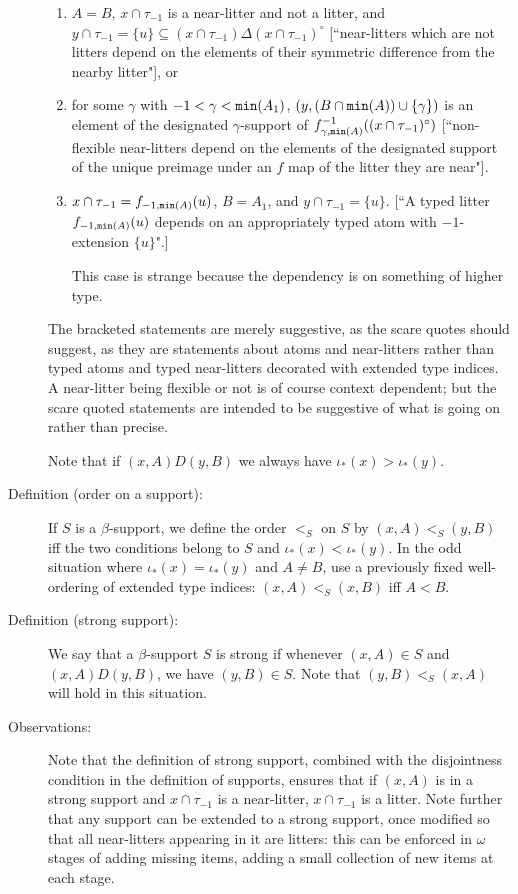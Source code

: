 \documentclass[112pt]{article}
\begin{document}
\begin{description}
\begin{enumerate}
\item $A=B$, $x \cap \tau_{-1}$ is a near-litter and not a litter, and $y \cap \tau_{-1} = \{u\} \subseteq (x \cap \tau_{-1}) \Delta (x \cap \tau_{-1})^\circ$ [``near-litters which are not litters depend on the elements of their symmetric difference from the nearby litter"], or

\item for some $\gamma$ with $-1 < \gamma<{\tt min}(A_1)$, $(y,(B\cap {\tt min}(A)) \cup \{\gamma\})$ is an element of the designated $\gamma$-support of $f_{\gamma,{\tt min}(A)}^{-1}((x \cap \tau_{-1})^\circ)$ [``non-flexible near-litters depend on the elements of the designated support of the unique preimage under an $f$ map of the litter they are near"].

\item $x \cap \tau_{-1}= f_{-1,{\tt min}(A)}(u)$, $B= A_1$, and $y \cap \tau_{-1}= \{u\}$.  [``A typed litter $f_{-1,{\tt min}(A)}(u)$ depends on an appropriately typed atom with $-1$-extension $\{u\}$".]

This case is strange because the dependency is on something of higher type.

\end{enumerate}

The bracketed statements are merely suggestive, as the scare quotes should suggest, as they are statements about atoms and near-litters rather than typed atoms and typed near-litters decorated with extended type indices.  A near-litter being flexible or not is of course context dependent;  but the scare quoted statements are intended to be suggestive of what is going on rather than precise.

Note that if $(x,A) D (y,B)$ we always have $\iota_*(x)>\iota_*(y)$.

\item[Definition (order on a support):]  If $S$ is a $\beta$-support, we define the order $<_S$ on $S$ by $(x,A) <_S (y,B)$ iff the two conditions belong to $S$ and
$\iota_*(x)<\iota_*(y)$.  In the odd situation where $\iota_*(x)=\iota_*(y)$ and $A \neq B$, use a previously fixed well-ordering of extended type indices:  $(x,A) <_S (x,B)$ iff $A < B$.

\item[Definition (strong support):]  We say that a $\beta$-support $S$ is strong if whenever $(x,A) \in S$ and $(x,A) D (y,B)$, we have $(y,B)\in S$.  Note that $(y,B) <_S (x,A)$ will hold in this situation.  

\item[Observations:]  Note that the definition of strong support, combined with the disjointness condition in the definition of supports, ensures that
if $(x,A)$ is in a strong support and $x \cap \tau_{-1}$ is a near-litter, $x \cap \tau_{-1}$ is a litter.  Note further that any support can be extended to a strong support, once modified so that all near-litters appearing in it are litters:  this can be enforced in $\omega$ stages of adding missing items, adding a small collection of new items at each stage.


\end{description}
\end{document}
